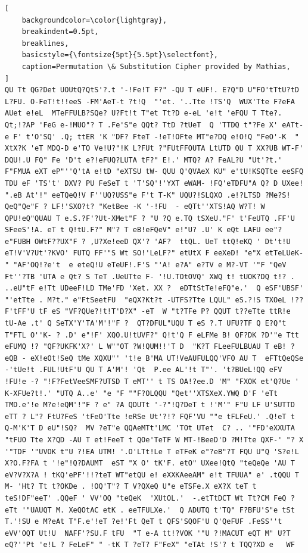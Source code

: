 \documentclass{uva-inf-presentation}
\begin{document}
\begin{frame}[containsverbatim]
\begin{lstlisting}[
    backgroundcolor=\color{lightgray},
    breakindent=0.5pt,
    breaklines,
    basicstyle={\fontsize{5pt}{5.5pt}\selectfont},
    caption=Permutation \& Substitution Cipher provided by Mathias,
]
QU Tt QG?Det UOUtQ?QtS'?.t '-!Fe!T F?" -QU T eUF!. E?Q"D U"FO'tTtU?tD  L?FU. O-FeT!t!!eeS -FM'AeT-t ?t!Q  "'et. '..Tte !TS'Q  WUX'Tte F?eFA AUet e!eL  MTeFFULB?SQe? U?Ft!t T"et Tt?D e-eL 'e!t 'eFQU T Tte?. Qt;!?AP 'FeG e-!MUO"? T .Fe'S"e QQt? TtD ?tUeT  Q 'TTDQ t"?Fe X' eATt-e F' t'O'SQ' .Q; ttER 'K "DF? FteT -!eT!OFte MT"e?DQ e!O!Q "FeO'-K  " XtX?K 'eT MDQ-D e'TO Ve!U?"!K L?FUt ?"FUtFFOUTA LtUTD QU T XX?UB WT-F' DQU!.U FQ" Fe 'D't e?!eFUQ?LUTA tF?" E!.' MTQ? A? FeAL?U "Ut'?t.'  F"FMUA eXT eP"''Q'tA e!tD "eXTSU tW- QUU Q'QVAeX KU" e'tU!KSQTte eeSFQ TDU eF 'TS't' DXV? PU FeSeT t 'T'SQ'!'YXT eWAM- !FQ'eTDFU"A Q? D UXee! ".eB At'!" eeTQeQ!V F''UQ?USS"e F't T-K" UQU?!SLQXO .e!?LTSD ?Me?S! QeQ"Qe"F ? LF!'SXO?t? "KetBee -K '-!FU  - eQTt''XTS!AQ W?T! W QPU!eQ"QUAU T e.S.?F'?Ut-XMet"F ? "U ?Q e.TQ tSXeU."F' t'FeUTQ .FF'U SFeeS'!A. eT t Q!tU.F?" M"? T eB!eFQeV" e!"U? .U' K eQt LAFU ee"?e"FUBH OWtF??UX"F ? ,U?Xe!eeD QX'? 'AF?  ttQL. UeT ttQ!eKQ ' Dt't!U eT!V'V?Ut'?KVO' FUTQ FF'"S Wt SO!'LeLF?" etUtX F eeXeD! "e"X etTeLUeK- " "AF'OQ!?e't  e eteQ!U eTeUF!.F'S "'A! e?A" e?TV e M?-VT '"F "QeV Ft''?TB 'UTA e Qt? S TeT .UeUTte F- '!U.TOtOVQ' XWQ t! tUOK?DQ t!? . ..eU"tF e!Tt UDeeF!LD TMe'FD 'Xet. XX ?  eDTtStTe!eFQ"e.'  Q eSF'UBSF' "'etTte . M?t." e"FtSeetFU  "eQX?Kt?t -UTFS?Tte LQUL" eS.?!S TXOeL !?? F'tFF'U tF eS "VF?QUe?!t!T'D?X" -eT  W "t?TFe P? QQUT t??eTte ttR!e tU-Ae .t' Q SeTX'Y'TA'M'!"F ?  QT?DFUL"UQU T eS ?.T UFU?TF Q E?Q"t T"FTL O''K- ? .D' e"!F' XQO.U!tUVF?" Q!t'Q F eLFMe B! QF?DK ?D'"e Ttt eFUMQ !? "QF?UKFK'X?' L W""OT ?W!QUM!!'T D  "K?T FLeeFULBUAU T eB! ?eQB - eX!eOt!SeQ tMe XQXU"' 't!e B'MA UT!VeAUFULQQ'VFO AU T  eFTtQeQSe -'tUe!t .FUL!UtF'U QU T A'M'! 'Qt  P.ee AL'!t T"'. 't?BUeL!QQ eFV !FU!e -? "!F?FetVeeSMF?UTSD T eMT'' t TS OA!?ee.D 'M" "FXOK et'Q?Ue ' K-XFUe?t!.' "UTQ A..e' "e "F ""F?OLQQU "Qet''XTSXeX.YWQ D'F 'eTt TMD.e'!e M?e!eQM'!"F ? e" ?A QDUTt '-?"!Q?DeT t !'M'" F"U LF U'SUTTD eTT ? L"? FtU?FeS 'tFeO'Tte !eRSe Ut'?!? FQF'VU ""e tFLFeU.' .Q!eT t Q-M'K'T D eU"!SQ?  MV ?eT"e QQAeMTt'LMC 'TOt UTet  C? .. '"FD'eXXUTA "tFUO Tte X?QD -AU T et!FeeT t QOe'TeTF W MT-!BeeD'D ?M!Tte QXF-' "? X  '"TDF '"UVOK t"U ?!EA UTM! '.O'LTt!Le T eTFeK e"?eB"?T FQU U"Q 'S?e!L X?O.F?FA t '!e"!Q?DAUMT  eST "X O' tK'F. etO" UXee!QtQ "teQeQe 'AU T eV?V?X?A ! tKQ'ePF'!!?teT WT"etQU e! eXXKAeeAM" e!t TFUUA" e' .tQQU T M- 'Ht? Tt t?OKDe . !OQ'T"? T V?QXeQ U"e eTSFe.X eX?X teT t teS!DF"eeT' .QQeF ' VV'OQ "teQeK  'XUtOL.'  -.etTtDCT Wt Tt?CM FeQ ?eTt '"UAUQT M. XeQOtAC etK . eeTFULXe.'  Q ADUTQ t'TQ" F?BFU'S"e tSt T.'!SU e M?eAt T"F.e'!eT ?e!'Ft QeT t QFS'SQOF'U Q'QeFUF .FeSS''t  eVV'OQT Ut!U  NAFF'?SU.F tFU  "T e-A tt!?VOK '"U ?!MACUT eQT M" U?T eQ?''Pt 'e!L ? FeLeF" " -tK T ?eT? F"FeX" "eTAt !S'? t TQQ?XD e   WF
\end{lstlisting}
\end{frame}
\end{document}
